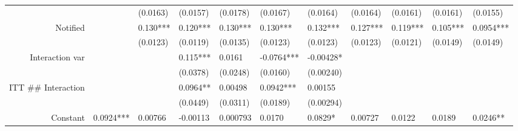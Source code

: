 \begin{tabular}{rrrrrrrrrrr}
      & \multicolumn{1}{l}{} & \multicolumn{1}{l}{(0.0163)} & \multicolumn{1}{l}{(0.0157)} & \multicolumn{1}{l}{(0.0178)} & \multicolumn{1}{l}{(0.0167)} & \multicolumn{1}{l}{(0.0164)} & \multicolumn{1}{l}{(0.0164)} & \multicolumn{1}{l}{(0.0161)} & \multicolumn{1}{l}{(0.0161)} & \multicolumn{1}{l}{(0.0155)} \\
Notified & \multicolumn{1}{l}{} & \multicolumn{1}{l}{0.130***} & \multicolumn{1}{l}{0.120***} & \multicolumn{1}{l}{0.130***} & \multicolumn{1}{l}{0.130***} & \multicolumn{1}{l}{0.132***} & \multicolumn{1}{l}{0.127***} & \multicolumn{1}{l}{0.119***} & \multicolumn{1}{l}{0.105***} & \multicolumn{1}{l}{0.0954***} \\
      & \multicolumn{1}{l}{} & \multicolumn{1}{l}{(0.0123)} & \multicolumn{1}{l}{(0.0119)} & \multicolumn{1}{l}{(0.0135)} & \multicolumn{1}{l}{(0.0123)} & \multicolumn{1}{l}{(0.0123)} & \multicolumn{1}{l}{(0.0123)} & \multicolumn{1}{l}{(0.0121)} & \multicolumn{1}{l}{(0.0149)} & \multicolumn{1}{l}{(0.0149)} \\
Interaction var & \multicolumn{1}{l}{} & \multicolumn{1}{l}{} & \multicolumn{1}{l}{0.115***} & \multicolumn{1}{l}{0.0161} & \multicolumn{1}{l}{-0.0764***} & \multicolumn{1}{l}{-0.00428*} & \multicolumn{1}{l}{} & \multicolumn{1}{l}{} & \multicolumn{1}{l}{} & \multicolumn{1}{l}{} \\
      & \multicolumn{1}{l}{} & \multicolumn{1}{l}{} & \multicolumn{1}{l}{(0.0378)} & \multicolumn{1}{l}{(0.0248)} & \multicolumn{1}{l}{(0.0160)} & \multicolumn{1}{l}{(0.00240)} & \multicolumn{1}{l}{} & \multicolumn{1}{l}{} & \multicolumn{1}{l}{} & \multicolumn{1}{l}{} \\
ITT \#\# Interaction & \multicolumn{1}{l}{} & \multicolumn{1}{l}{} & \multicolumn{1}{l}{0.0964**} & \multicolumn{1}{l}{0.00498} & \multicolumn{1}{l}{0.0942***} & \multicolumn{1}{l}{0.00155} & \multicolumn{1}{l}{} & \multicolumn{1}{l}{} & \multicolumn{1}{l}{} & \multicolumn{1}{l}{} \\
      & \multicolumn{1}{l}{} & \multicolumn{1}{l}{} & \multicolumn{1}{l}{(0.0449)} & \multicolumn{1}{l}{(0.0311)} & \multicolumn{1}{l}{(0.0189)} & \multicolumn{1}{l}{(0.00294)} & \multicolumn{1}{l}{} & \multicolumn{1}{l}{} & \multicolumn{1}{l}{} & \multicolumn{1}{l}{} \\
Constant & \multicolumn{1}{l}{0.0924***} & \multicolumn{1}{l}{0.00766} & \multicolumn{1}{l}{-0.00113} & \multicolumn{1}{l}{0.000793} & \multicolumn{1}{l}{0.0170} & \multicolumn{1}{l}{0.0829*} & \multicolumn{1}{l}{0.00727} & \multicolumn{1}{l}{0.0122} & \multicolumn{1}{l}{0.0189} & \multicolumn{1}{l}{0.0246**} \\

\end{tabular}
